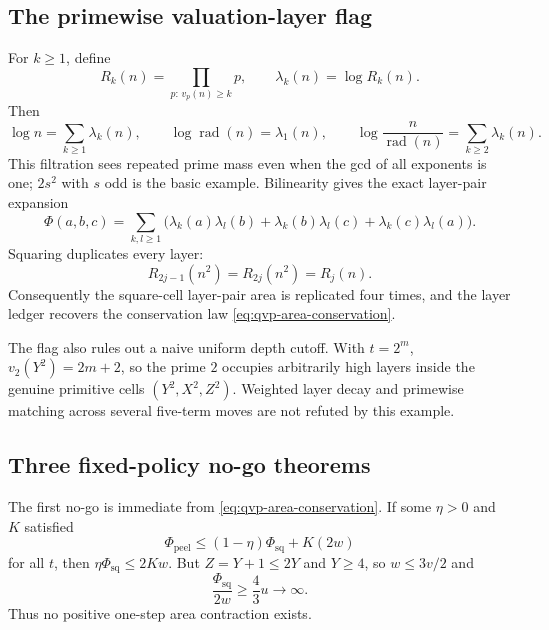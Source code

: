 \subsection{The primewise valuation-layer flag}

For $k\geq1$, define
\[
 R_k(n)=\prod_{p:\,v_p(n)\geq k}p,
 \qquad \lambda_k(n)=\log R_k(n).
\]
Then
\begin{equation}
 \log n=\sum_{k\geq1}\lambda_k(n),\qquad
 \log\operatorname{rad}(n)=\lambda_1(n),\qquad
 \log\frac{n}{\operatorname{rad}(n)}
 =\sum_{k\geq2}\lambda_k(n).
 \label{eq:qvp-layer-cake}
\end{equation}
This filtration sees repeated prime mass even when the gcd of all exponents
is one; $2s^2$ with $s$ odd is the basic example.  Bilinearity gives the
exact layer-pair expansion
\begin{equation}
 \Phi(a,b,c)=\sum_{k,l\geq1}
 \bigl(\lambda_k(a)\lambda_l(b)
      +\lambda_k(b)\lambda_l(c)
      +\lambda_k(c)\lambda_l(a)\bigr).
 \label{eq:qvp-layer-pairs}
\end{equation}
Squaring duplicates every layer:
\begin{equation}
 R_{2j-1}(n^2)=R_{2j}(n^2)=R_j(n).
 \label{eq:qvp-layer-duplication}
\end{equation}
Consequently the square-cell layer-pair area is replicated four times, and
the layer ledger recovers the conservation law
\eqref{eq:qvp-area-conservation}.

The flag also rules out a naive uniform depth cutoff.  With $t=2^m$,
$v_2(Y^2)=2m+2$, so the prime $2$ occupies arbitrarily high layers inside
the genuine primitive cells $(Y^2,X^2,Z^2)$.  Weighted layer decay and
primewise matching across several five-term moves are not refuted by this
example.

\subsection{Three fixed-policy no-go theorems}

The first no-go is immediate from
\eqref{eq:qvp-area-conservation}.  If some $\eta>0$ and $K$ satisfied
\[
 \Phi_{\mathrm{peel}}
 \leq(1-\eta)\Phi_{\mathrm{sq}}+K(2w)
\]
for all $t$, then $\eta\Phi_{\mathrm{sq}}\leq2Kw$.  But $Z=Y+1\leq2Y$
and $Y\geq4$, so $w\leq3v/2$ and
\[
 \frac{\Phi_{\mathrm{sq}}}{2w}\geq\frac43u\longrightarrow\infty.
\]
Thus no positive one-step area contraction exists.


